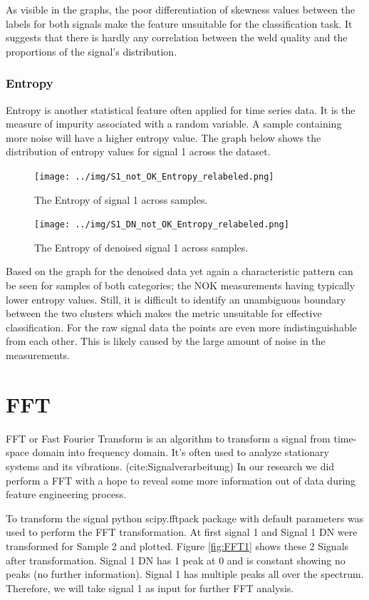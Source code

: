 \documentclass[12pt]{report}
\begin{document}
As visible in the graphs, the poor differentiation of skewness values between the labels for both signals make the feature unsuitable for the classification task. It suggests that there is hardly any correlation between the weld quality and the proportions of the signal’s distribution.
\subsubsection{Entropy}
Entropy is another statistical feature often applied for time series data. It is the measure of impurity associated with a random variable. A sample containing more noise will have a higher entropy value. The graph below shows the distribution of entropy values for signal 1 across the dataset.
\begin{figure}[H]
	\texttt{[image: ../img/S1\_not\_OK\_Entropy\_relabeled.png]}
	\caption{The Entropy of signal 1 across samples.}
	\label{fig:S1EN}
\end{figure}
\begin{figure}[H]
	\texttt{[image: ../img/S1\_DN\_not\_OK\_Entropy\_relabeled.png]}
	\caption{The Entropy of denoised signal 1 across samples.}
	\label{fig:S1DNEN}
\end{figure}
Based on the graph for the denoised data yet again a characteristic pattern can be seen for samples of both categories; the NOK measurements having typically lower entropy values. Still, it is difficult to identify an unambiguous boundary between the two clusters which makes the metric unsuitable for effective classification. For the raw signal data the points are even more indistinguishable from each other. This is likely caused by the large amount of noise in the measurements.

\section{FFT}
FFT or Fast Fourier Transform is an algorithm to transform a signal from time-space domain into frequency domain. It’s often used to analyze stationary systems and its vibrations. (cite:Signalverarbeitung) In our research we did perform a FFT with a hope to reveal some more information out of data during feature engineering process. 




To transform the signal python scipy.fftpack package with default parameters was used to perform the FFT transformation. At first signal 1 and Signal 1 DN were transformed for Sample 2 and plotted. Figure \ref{fig:FFT1} shows these 2 Signals after transformation. Signal 1 DN has 1 peak at 0 and is constant showing no peaks (no further information). Signal 1 has multiple peaks all over the spectrum. Therefore, we will take signal 1 as input for further FFT analysis.
\end{document}
